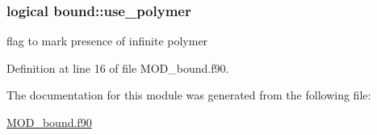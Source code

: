 \hypertarget{classbound_ac47b8ce758ea3ac44b1af1f2876267e9}{
\subsubsection[{use\-\_\-polymer}]{\setlength{\rightskip}{0pt plus 5cm}logical bound\-::use\-\_\-polymer}}\label{classbound_ac47b8ce758ea3ac44b1af1f2876267e9}


flag to mark presence of infinite polymer 



Definition at line 16 of file M\-O\-D\-\_\-bound.\-f90.



The documentation for this module was generated from the following file\-:\begin{DoxyCompactItemize}
\item 
\hyperlink{MOD__bound_8f90}{M\-O\-D\-\_\-bound.\-f90}\end{DoxyCompactItemize}
